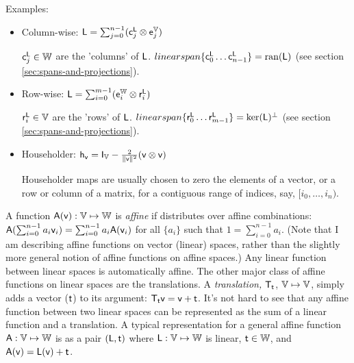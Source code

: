 Examples:

\begin{itemize}

\item Column-wise:
$\mathsf{L} = \sum_{j=0}^{n-1} ( \mathsf{c}_j^{\mathsf{L}} \otimes \mathsf{e}_j^{\mathbb{V}} )$

$\mathsf{c}_j^{\mathsf{L}} \in \mathbb{W}$ are the 'columns' of $\mathsf{L}$.
$\\linearspan\{ \mathsf{c}_0^{\mathsf{L}} \ldots \mathsf{c}_{n-1}^{\mathsf{L}} \} = \mathrm{ran}(\mathsf{L})$
(see section \ref{sec:spans-and-projections}).

\item Row-wise:
$\mathsf{L} = \sum_{i=0}^{m-1} ( \mathsf{e}_i^{\mathbb{W}} \otimes  \mathsf{r}_i^{\mathsf{L}} )$

$\mathsf{r}_i^{\mathsf{L}} \in \mathbb{V}$ are the 'rows' of $\mathsf{L}$.
$\\linearspan\{ \mathsf{r}_0^{\mathsf{L}} \ldots \mathsf{r}_{m-1}^{\mathsf{L}} \} =  \mathrm{ker}(\mathsf{L})^{\perp}$
(see section \ref{sec:spans-and-projections}).

\item Householder:
$\mathsf{h}_{\mathsf{v}} = \mathsf{I}_{\mathbb{V}} - \frac{2}{\| \mathsf{v} \|^2} (\mathsf{v} \otimes \mathsf{v})$

Householder maps are usually chosen to zero the elements of
a vector, or a row or column of a matrix, for a contiguous range of
indices, say, $[i_0,\ldots,i_n)$.

\end {itemize}

\label{sec:affine-functions}

A function $\mathsf{A}(\mathsf{v}):\mathbb{V} \mapsto \mathbb{W}$
is {\it affine} if distributes over affine combinations:
$\mathsf{A}(\sum_{i=0}^{n-1} a_i \mathsf{v}_i) = \sum_{i=0}^{n-1} a_i \mathsf{A}(\mathsf{v}_i) $
for all $\{a_i\}$ such that $1 = \sum_{i=0}^{n-1} a_i$.
(Note that I am describing affine functions on vector (linear) spaces,
rather than the slightly more general notion of affine functions on affine spaces.)
Any linear function between linear spaces is automatically affine.
The other major class of affine functions on linear spaces are the translations.
A {\it translation,} $\mathsf{T}_{\mathsf{t}}$, $\mathbb{V} \mapsto \mathbb{V}$,
simply adds a vector ($\mathsf{t}$) to its argument:
$\mathsf{T}_{\mathsf{t}} \mathsf{v} = \mathsf{v} + \mathsf{t}$.
It's not hard to see that any affine function between two linear spaces
can be represented as the sum of a linear function and a translation.
A typical representation for a general affine function $\mathsf{A} : \mathbb{V} \mapsto \mathbb{W}$
is as a pair $(\mathsf{L},\mathsf{t})$ where $\mathsf{L} : \mathbb{V} \mapsto \mathbb{W}$ is linear,
$\mathsf{t} \in \mathbb{W}$, and $\mathsf{A}(\mathsf{v}) = \mathsf{L}(\mathsf{v}) + \mathsf{t}$.

